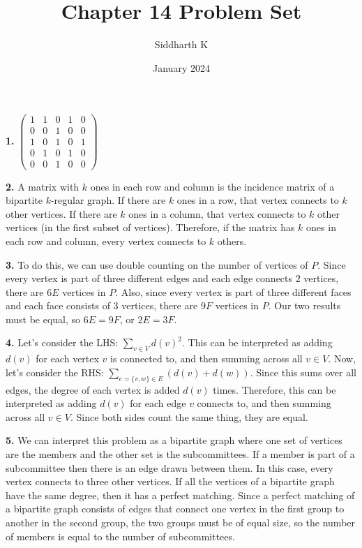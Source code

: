 \documentclass{article}
\title{Chapter 14 Problem Set}
\author{Siddharth K}
\date{January 2024}
\begin{document}
\maketitle

\textbf{1.} $\begin{pmatrix}1&1&0&1&0 \\ 0&0&1&0&0 \\ 1&0&1&0&1 \\ 0&1&0&1&0 \\ 0&0&1&0&0\end{pmatrix}$
\newline

\textbf{2.} A matrix with $k$ ones in each row and column is the incidence matrix of a bipartite $k$-regular graph. If there are $k$ ones in a row, that vertex connects to $k$ other vertices. If there are $k$ ones in a column, that vertex connects to $k$ other vertices (in the first subset of vertices). Therefore, if the matrix has $k$ ones in each row and column, every vertex connects to $k$ others.
\newline

\textbf{3.} To do this, we can use double counting on the number of vertices of $P$. Since every vertex is part of three different edges and each edge connects $2$ vertices, there are $6E$ vertices in $P$. Also, since every vertex is part of three different faces and each face consists of $3$ vertices, there are $9F$ vertices in $P$. Our two  results must be equal, so $6E = 9F$, or $2E = 3F$.
\newline

\textbf{4.} Let's consider the LHS: $\sum_{v\in V} d(v)^2$. This can be interpreted as adding $d(v)$ for each vertex $v$ is connected to, and then summing across all $v \in V$. Now, let's consider the RHS: $\sum_{e=\{v, w\} \in E} (d(v) + d(w))$. Since this sums over all edges, the degree of each vertex is added $d(v)$ times. Therefore, this can be interpreted as adding $d(v)$ for each edge $v$ connects to, and then summing across all $v \in V$. Since both sides count the same thing, they are equal.
\newline

\textbf{5.} We can interpret this problem as a bipartite graph where one set of vertices are the members and the other set is the subcommittees. If a member is part of a subcommittee then there is an edge drawn between them. In this case, every vertex connects to three other vertices. If all the vertices of a bipartite graph have the same degree, then it has a perfect matching. Since a perfect matching of a bipartite graph consists of edges that connect one vertex in the first group to another in the second group, the two groups must be of equal size, so the number of members is equal to the number of subcommittees.
\newline
\end{document}
